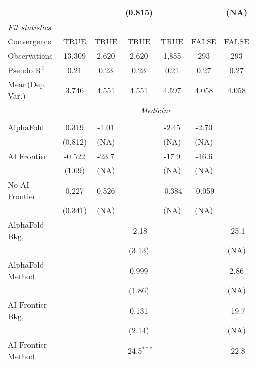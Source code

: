 \begin{tabular}{lcccccc}
                           &              &              & (0.815)      &         &              & (NA)\\   
   \midrule
   \emph{Fit statistics}\\
   Convergence             &TRUE          & TRUE         & TRUE         & TRUE    & FALSE        & FALSE\\  
   Observations            & 13,309       & 2,620        & 2,620        & 1,855   & 293          & 293\\  
   Pseudo R$^2$            & 0.21         & 0.23         & 0.23         & 0.21    & 0.27         & 0.27\\  
   
Mean(Dep. Var.) & 3.746 & 4.551 & 4.551 & 4.597 & 4.058 & 4.058 \\
 & \multicolumn{6}{c}{\textit{Medicine}} \\ \\
   AlphaFold               & 0.319   & -1.01 &               & -2.45  & -2.70  &   \\   
                           & (0.812) & (NA)  &               & (NA)   & (NA)   &   \\   
   AI Frontier             & -0.522  & -23.7 &               & -17.9  & -16.6  &   \\   
                           & (1.69)  & (NA)  &               & (NA)   & (NA)   &   \\   
   No AI Frontier          & 0.227   & 0.526 &               & -0.384 & -0.059 &   \\   
                           & (0.341) & (NA)  &               & (NA)   & (NA)   &   \\   
   AlphaFold - Bkg.        &         &       & -2.18         &        &        & -25.1\\   
                           &         &       & (3.13)        &        &        & (NA)\\   
   AlphaFold - Method      &         &       & 0.999         &        &        & 2.86\\   
                           &         &       & (1.86)        &        &        & (NA)\\   
   AI Frontier - Bkg.      &         &       & 0.131         &        &        & -19.7\\   
                           &         &       & (2.14)        &        &        & (NA)\\   
   AI Frontier - Method    &         &       & -24.5$^{***}$ &        &        & -22.8\\   

\end{tabular}
